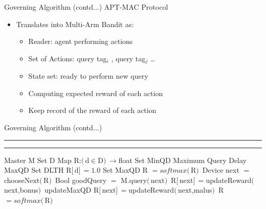 \documentclass [xcolor=svgnames, t] {beamer}
\begin{document}
\begin{frame}{Governing Algorithm (contd...)}
    APT-MAC Protocol\autocite{maselli}\\
    \vspace{.5cm}
    \begin{itemize}
        \item Translates into Multi-Arm Bandit as:
            \vspace{0.2cm}
            \begin{itemize}
                \item Reader: agent performing actions
                    \vspace{0.2cm}
                \item Set of Actions: query tag$_i$ , query tag$_j$ \ldots
                    \vspace{0.2cm}
                \item State set: ready to perform new query
                    \vspace{0.2cm}
                \item Computing expected reward of each action
                    \vspace{0.2cm}
                \item Keep record of the reward of each action
            \end{itemize}
    \end{itemize}

\end{frame}


\begin{frame}[allowframebreaks]{Governing Algorithm (contd...)}
    \rule{\textwidth}{0.5pt}
    \vspace*{-0.5cm}
    \vspace*{-0.5cm}
    \rule{\textwidth}{0.5pt}
        \begin{algorithmic}[1]
            \State Master M 
            \State Set D 
            \State Map R:$(\,$d$\in$D$)\,\to$float 
            \State Set MinQD 
            \State Maximum Query Delay MaxQD
            \State Set DLTH 
                \State R$[\,$d$]\, = 1.0$
                \State Set MaxQD
            \EndFor
            \State R $= softmax(\,$R$)\,$
                \State Device next $=$ chooseNext$(\,$R$)\,$
                \State Bool goodQuery $=$ M.query$(\,$next$)\,$
                    \State R$[\,$next$]\,=$updateReward$(\,$next,bonus$)\,$
                        \State updateMaxQD
                    \EndIf
                    \Else
                    \State R$[\,$next$]\,=$updateReward$(\,$next,malus$)\,$
                \EndIf
                \State R $= softmax(\,$R$)\,$
            \EndWhile
        \end{algorithmic}
\end{frame}
\end{document}
